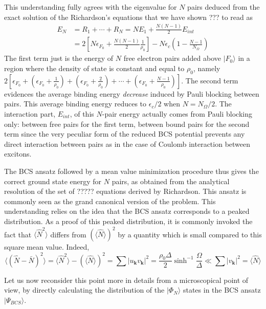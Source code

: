 \documentclass[aps,prb,preprint,groupedaddress,amsmath]{revtex4}
\newcommand{\vk}{\ensuremath{\mathbf{k}}}
\begin{document}
This understanding fully agrees with the  eigenvalue for $N$ pairs deduced from the exact solution of the Richardson's equations that we have shown ??? to read as
\begin{equation}
\begin{split}
E_N&=R_1+\cdots+R_N=NE_1+\frac{N(N-1)}2E_{int}\\
&=2\left[N\epsilon_{F_0}+\frac{N(N-1)}2\frac{1}{\rho_0}\right]-N\epsilon_c(1-\frac{N-1}{N_\Omega})
\end{split}
\end{equation}
The first term just is the energy of $N$ free electron pairs added above $|F_0{\rangle}$ in a region where the density of state is constant and equal to $\rho_0$, namely $2[\epsilon_{F_0}+(\epsilon_{F_0}+\frac{1}{\rho_0})+(\epsilon_{F_0}+\frac{2}{\rho_0})+\cdots+(\epsilon_{F_0}+\frac{N-1}{\rho_0})]$.  The second term evidences the average binding energy \emph{decrease} {induced} by Pauli blocking between pairs.    This average binding energy reduces to $\epsilon_c/2$ when $N=N_{\Omega}/2$.  The interaction part, $E_{int}$, of this $N$-pair energy actually comes from Pauli blocking only: between free pairs for the first term, between bound pairs for the second term since the very peculiar form of the reduced BCS potential prevents any direct interaction between pairs as in the case of Coulomb interaction between excitons.  

The BCS  ansatz followed by a mean value minimization procedure thus  gives the correct ground state energy for $N$ pairs, as obtained from the analytical resolution of the set of ????? equations derived by Richardson. This ansatz is commonly seen as the grand canonical version of the problem. This understanding relies on the idea that the BCS ansatz corresponds to a peaked distribution. As a proof of this peaked distribution, it is commonly invoked the fact that $\langle\hat{N}^2\rangle$ differs from $(\langle\hat{N}\rangle)^2$ by a quantity which is small compared to this square mean value.  Indeed, 
\begin{equation}
 \langle(\hat{N}-\bar{N})^2\rangle=\langle\hat{N}^2\rangle-(\langle\hat{N}\rangle)^2=\sum{}|u_\vk{}v_\vk|^2=\frac{\rho_0\Delta}2\sinh^{-1}{\frac{\Omega}{\Delta}}\ll\sum{}|v_\vk|^2=\langle\hat{N}\rangle
\end{equation}


Let us now reconsider this point more in details from a microscopical point of view, by directly calculating the distribution of the $|\Phi_N\rangle$ states in the BCS ansatz $|\Psi_{BCS}\rangle$.  
\end{document}
